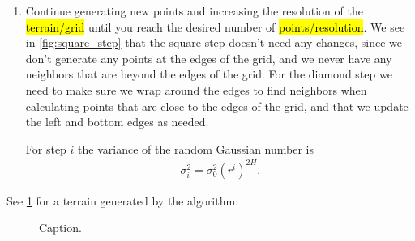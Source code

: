 \begin{enumerate}
    

    \item Continue generating new points and increasing the resolution of the \hl{terrain/grid} until you reach the desired number of \hl{points/resolution}. We see in \cref{fig:square_step} that the square step doesn't need any changes, since we don't generate any points at the edges of the grid, and we never have any neighbors that are beyond the edges of the grid. For the diamond step we need to make sure we wrap around the edges to find neighbors when calculating points that are close to the edges of the grid, and that we update the left and bottom edges as needed. 
    
    For step $i$ the variance of the random Gaussian number is
    \begin{align*}
        \sigma_i^2 = \sigma_0^2(r^i)^{2H}.
    \end{align*}
\end{enumerate}

See \cref{fig:diamond_square_terrain} for a terrain generated by the algorithm.

\begin{figure}
    \centering
    
    \caption{
        Caption.
        \label{fig:diamond_square_terrain}
    }
\end{figure}

